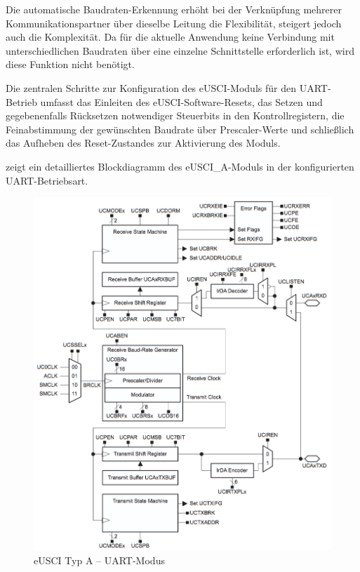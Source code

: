 Die automatische Baudraten-Erkennung erh\"oht bei der Verkn\"upfung mehrerer Kommunikationspartner \"uber dieselbe Leitung die Flexibilit\"at, steigert jedoch auch die Komplexit\"at. Da f\"ur die aktuelle Anwendung keine Verbindung mit unterschiedlichen Baudraten \"uber eine einzelne Schnittstelle erforderlich ist, wird diese Funktion nicht ben\"otigt.

Die zentralen Schritte zur Konfiguration des eUSCI-Moduls für den UART-Betrieb umfasst das Einleiten des eUSCI-Software-Resets, das Setzen und gegebenenfalls R\"ucksetzen notwendiger Steuerbits in den Kontrollregistern, die Feinabstimmung der gew\"unschten Baudrate \"uber Prescaler-Werte und schließlich das Aufheben des Reset-Zustandes zur Aktivierung des Moduls.

 zeigt ein detailliertes Blockdiagramm des eUSCI\_A-Moduls in der konfigurierten UART-Betriebsart.

\begin{figure}[h!]
	\centering
	\includegraphics[width=1.0\textwidth]{../Bilder/eUSCI_UART.png}
	\caption{eUSCI Typ A -- UART-Modus\\}
	\label{fig:BlockDiagramm_eUSCI_A_UART}
\end{figure}